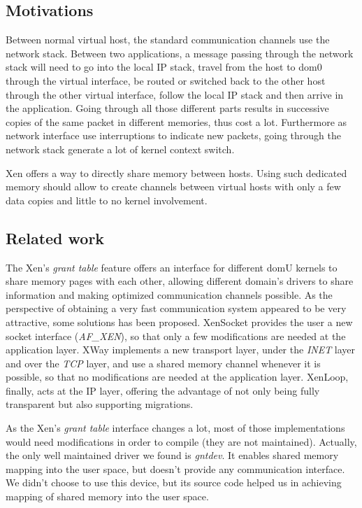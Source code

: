 \documentclass[journal]{IEEEtran}
\begin{document}
\subsection{Motivations}

Between normal virtual host, the standard communication channels use the network stack.
Between two applications, a message passing through the network stack will need to go into the local IP stack, travel from the host to dom0 through the virtual interface, be routed or switched back to the other host through the other virtual interface, follow the local IP stack and then arrive in the application.
Going through all those different parts results in successive copies of the same packet in different memories, thus cost a lot.
Furthermore as network interface use interruptions to indicate new packets, going through the network stack generate a lot of kernel context switch.



Xen offers a way to directly share memory between hosts.
Using such dedicated memory should allow to create channels between virtual hosts with only a few data copies and little to no kernel involvement.

\subsection{Related work}

The Xen's \emph{grant table} feature offers an interface for different domU kernels to share memory pages with each other, allowing different domain's drivers to share information and making optimized communication channels possible. As the perspective of obtaining a very fast communication system appeared to be very attractive, some solutions has been proposed. XenSocket\cite{XenSocket} provides the user a new socket interface (\emph{AF\_XEN}), so that only a few modifications are needed at the application layer. XWay\cite{XWay} implements a new transport layer, under the \emph{INET} layer and over the \emph{TCP} layer, and use a shared memory channel whenever it is possible, so that no modifications are needed at the application layer. XenLoop\cite{XenLoop}, finally, acts at the IP layer, offering the advantage of not only being fully transparent but also supporting migrations. 

As the Xen's \emph{grant table} interface changes a lot, most of those implementations would need modifications in order to compile (they are not maintained). Actually, the only well maintained driver we found is \emph{gntdev}. It enables shared memory mapping into the user space, but doesn't provide any communication interface. We didn't choose to use this device, but its source code helped us in achieving mapping of shared memory into the user space. 
\end{document}
